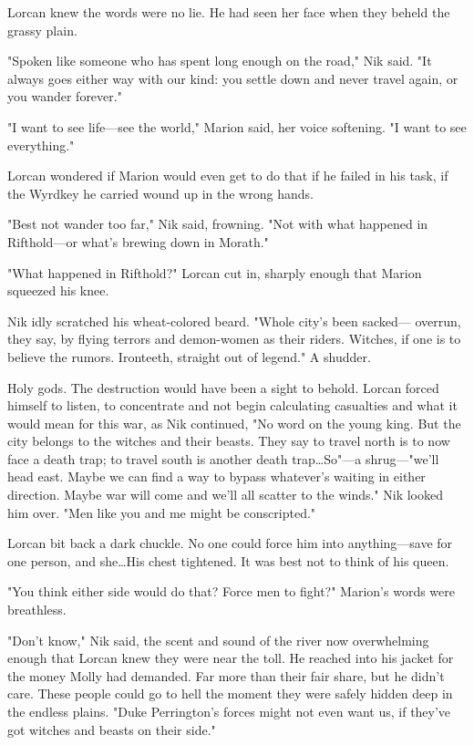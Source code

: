 Lorcan knew the words were no lie.
He had seen her face when they beheld the grassy plain.

"Spoken like someone who has spent long enough on the road," Nik said.
"It always goes either way with our kind: you settle down and never travel again, or you wander forever."

"I want to see life---see the world," Marion said, her voice softening.
"I want to see everything."

Lorcan wondered if Marion would even get to do that if he failed in his task, if the Wyrdkey he carried wound up in the wrong hands.

"Best not wander too far," Nik said, frowning.
"Not with what happened in Rifthold---or what's brewing down in Morath."

"What happened in Rifthold?"
Lorcan cut in, sharply enough that Marion squeezed his knee.

Nik idly scratched his wheat-colored beard.
"Whole city's been sacked--- overrun, they say, by flying terrors and demon-women as their riders.
Witches, if one is to believe the rumors.
Ironteeth, straight out of legend."
A shudder.

Holy gods.
The destruction would have been a sight to behold.
Lorcan forced himself to listen, to concentrate and not begin calculating casualties and what it would mean for this war, as Nik continued, "No word on the young king.
But the city belongs to the witches and their beasts.
They say to travel north is to now face a death trap; to travel south is another death trap\ldots So"---a shrug---"we'll head east.
Maybe we can find a way to bypass whatever's waiting in either direction.
Maybe war will come and we'll all scatter to the winds."
Nik looked him over.
"Men like you and me might be conscripted."

Lorcan bit back a dark chuckle.
No one could force him into anything---save for one person, and she\ldots His chest tightened.
It was best not to think of his queen.

"You think either side would do that?
Force men to fight?"
Marion's words were breathless.

"Don't know," Nik said, the scent and sound of the river now overwhelming enough that Lorcan knew they were near the toll.
He reached into his jacket for the money Molly had demanded.
Far more than their fair share, but he didn't care.
These people could go to hell the moment they were safely hidden deep in the endless plains.
"Duke Perrington's forces might not even want us, if they've got witches and beasts on their side."

